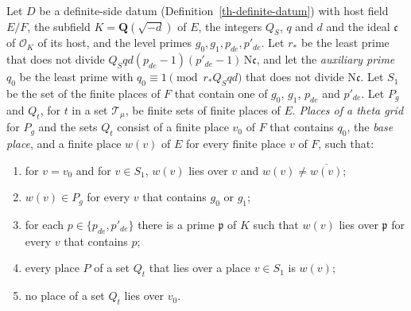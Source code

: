 \begin{definition}\label{th-grid-places}
Let $D$ be a definite-side datum (Definition~\ref{th-definite-datum}) with
host field $E/F$, the subfield $K=\mathbf Q(\sqrt{-d})$ of $E$, the integers
$Q_S$, $q$ and $d$ and the ideal $\mathfrak c$ of $\mathcal O_K$ of its host,
and the level primes $g_0,g_1,p_{de},p'_{de}$. Let $r_\ast$ be the least prime
that does not divide $Q_Sqd(p_{de}-1)(p'_{de}-1)\,\mathrm N\mathfrak c$, and
let the \emph{auxiliary prime} $q_0$ be the least prime with
$q_0\equiv1\pmod{r_\ast Q_Sqd}$ that does not divide $\mathrm N\mathfrak c$. Let
$S_1$ be the set of the finite places of $F$ that contain one of $g_0$, $g_1$,
$p_{de}$ and $p'_{de}$. Let $P_g$ and $Q_t$, for $t$ in a set
$\mathcal T_\mu$, be finite sets of finite places of $E$. \emph{Places of a
theta grid} for $P_g$ and the sets $Q_t$ consist of a finite place $v_0$ of $F$
that contains $q_0$, the \emph{base place}, and a finite place $w(v)$ of $E$
for every finite place $v$ of $F$, such that:
\begin{enumerate}
\item for $v=v_0$ and for $v\in S_1$, $w(v)$ lies over $v$ and
  $w(v)\neq\overline{w(v)}$;
\item $w(v)\in P_g$ for every $v$ that contains $g_0$ or $g_1$;
\item for each $p\in\{p_{de},p'_{de}\}$ there is a prime $\mathfrak p$ of $K$
  such that $w(v)$ lies over $\mathfrak p$ for every $v$ that contains $p$;
\item every place $P$ of a set $Q_t$ that lies over a place $v\in S_1$ is
  $w(v)$;
\item no place of a set $Q_t$ lies over $v_0$.
\end{enumerate}
\end{definition}

